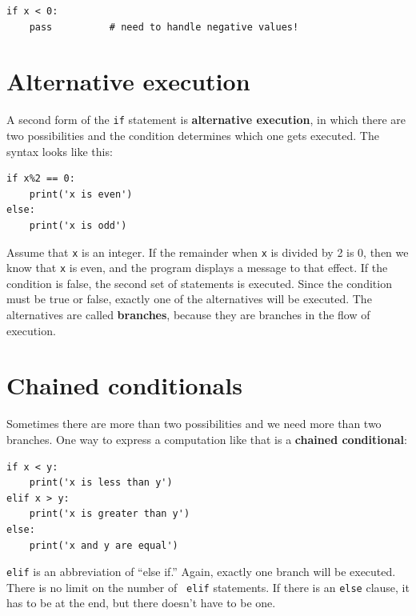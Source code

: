 \documentclass[10pt]{book}
\begin{document}

\beforeverb
\begin{verbatim}
if x < 0:
    pass          # need to handle negative values!
\end{verbatim}
\afterverb
%

\section{Alternative execution}
\label{alternative execution}


A second form of the {\tt if} statement is {\bf alternative execution},
in which there are two possibilities and the condition determines
which one gets executed.  The syntax looks like this:

\beforeverb
\begin{verbatim}
if x%2 == 0:
    print('x is even')
else:
    print('x is odd')
\end{verbatim}
\afterverb
%
Assume that {\tt x} is an integer. If the remainder when {\tt x} is divided by 2 is 0, then we
know that {\tt x} is even, and the program displays a message to that
effect.  If the condition is false, the second set of statements is
executed.  Since the condition must be true or false, exactly one of
the alternatives will be executed.  The alternatives are called
{\bf branches}, because they are branches in the flow of execution.




\section{Chained conditionals}

Sometimes there are more than two possibilities and we need more than
two branches.  One way to express a computation like that is a {\bf
chained conditional}:

\beforeverb
\begin{verbatim}
if x < y:
    print('x is less than y')
elif x > y:
    print('x is greater than y')
else:
    print('x and y are equal')
\end{verbatim}
\afterverb
%
{\tt elif} is an abbreviation of ``else if.''  Again, exactly one
branch will be executed.  There is no limit on the number of {\tt
elif} statements.  If there is an {\tt else} clause, it has to be
at the end, but there doesn't have to be one.
\end{document}
